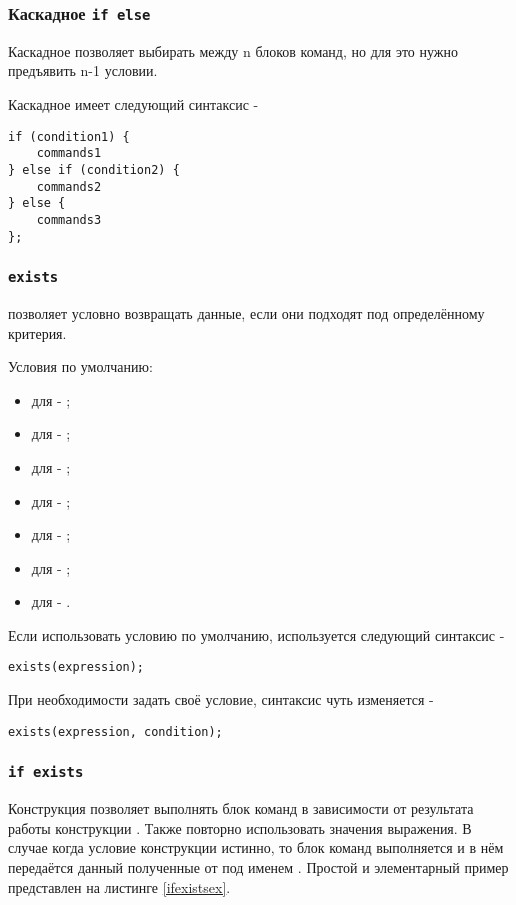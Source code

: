 \documentclass[a4paper, 14pt]{extarticle}
\newenvironment{icItems}
	{ \begin{itemize} [noitemsep,nolistsep] }
	{ \end{itemize} }
\begin{document}
\subsubsection{Каскадное \lstinline`if else`}

Каскадное  позволяет выбирать между n блоков команд, но для это нужно предъявить n-1 условии.

Каскадное  имеет следующий синтаксис -
\begin{lstlisting}[numbers=none]
if (condition1) {
	commands1
} else if (condition2) {
	commands2
} else {
	commands3
};
\end{lstlisting}

\subsubsection{\lstinline`exists`}

 позволяет условно возвращать данные, если они подходят под определённому критерия.

Условия по умолчанию:
\begin{icItems}
\item
	для \bool{} - ;
\item
	для \integer{} - ;
\item
	для \double{} - ;
\item
	для \str{} - ;
\item
	для \listtype{} - ;
\item
	для \set{} - ;
\item
	для \element{} - .
\end{icItems}

Если использовать условию по умолчанию, используется следующий синтаксис -
\begin{lstlisting}[numbers=none]
exists(expression);
\end{lstlisting}
При необходимости задать своё условие, синтаксис чуть изменяется -
\begin{lstlisting}[numbers=none]
exists(expression, condition);
\end{lstlisting}

\subsubsection{\lstinline`if exists`}

Конструкция  позволяет выполнять блок команд в зависимости от результата работы конструкции . Также повторно использовать значения выражения. В случае когда условие конструкции  истинно, то блок команд выполняется и в нём передаётся данный полученные от  под именем .
Простой и элементарный пример представлен на листинге \ref{ifexistsex}.
\end{document}
